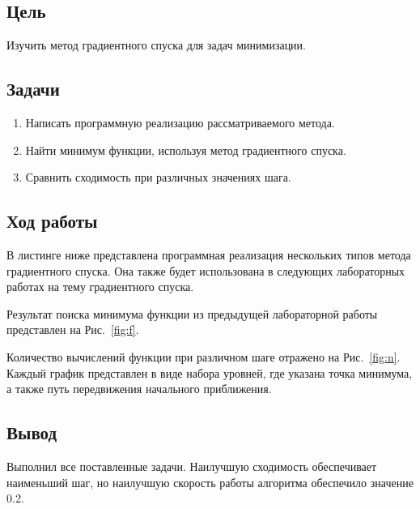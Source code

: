 


    
\newcommand{\labn}{6}


\subsection*{Цель}

Изучить метод градиентного спуска для задач минимизации.

\subsection*{Задачи}

\begin{enumerate}
    \item Написать программную реализацию рассматриваемого метода.
    \item Найти минимум функции, используя метод градиентного спуска.
    \item Сравнить сходимость при различных значениях шага.
\end{enumerate}

\subsection*{Ход работы}

В листинге ниже представлена программная реализация нескольких типов метода градиентного спуска.
Она также будет использована в следующих лабораторных работах на тему градиентного спуска.

Результат поиска минимума функции из предыдущей лабораторной работы представлен на Рис.~\ref{fig:f}.

Количество вычислений функции при различном шаге отражено на Рис.~\ref{fig:n}.
Каждый график представлен в виде набора уровней, где указана точка минимума, а также путь передвижения начального приближения.

\subsection*{Вывод}

Выполнил все поставленные задачи. 
Наилучшую сходимость обеспечивает наименьший шаг, но наилучшую скорость работы алгоритма обеспечило значение 0.2.


